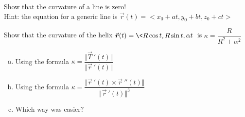 \begin{list}{\bf{Example : }}{}

\item Show that the curvature of a line is zero!\\
Hint: the equation for a generic line is \(\vec{r}(t) = <x_0+at, y_0+bt, z_0+ct>\)

\vfill

\item Show that the curvature of the helix \(\vec{r}(t) = \<R \cos t, R \sin t, \alpha t\>\) is \(\kappa = \dfrac{R}{R^2+\alpha^2}\)
\begin{enumerate}[(a)]
\item Using the formula \(\kappa = \dfrac{\Vert\vec{T}\ '(t)\Vert}{\Vert\vec{r}\ '(t)\Vert}\)
\item Using the formula \(\kappa = \dfrac{\Vert\vec{r}\ '(t) \times \vec{r}\ ''(t)\Vert}{\Vert\vec{r}\ '(t)\Vert^3}\)
\item Which way was easier?
\end{enumerate}

\vfill
%



\end{list}


